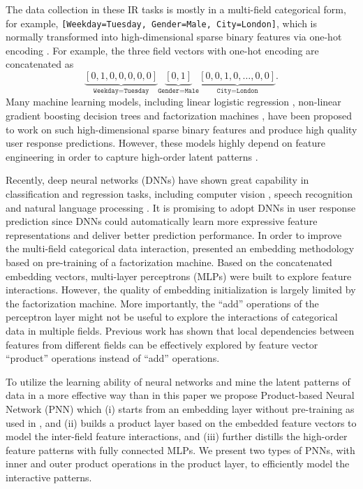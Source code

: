 \documentclass[conference]{IEEEtran}
\begin{document}
The data collection in these IR tasks is mostly in a multi-field categorical form, for example, \texttt{[Weekday=Tuesday, Gender=Male, City=London]}, which is normally transformed into high-dimensional sparse binary features via one-hot encoding \cite{he2014practical}.
For example, the three field vectors with one-hot encoding are concatenated as
\[ \underbrace{[0,1,0,0,0,0,0]}_{\texttt{Weekday=Tuesday}}\underbrace{[0,1]}_{\texttt{Gender=Male}} \underbrace{[0,0,1,0,\ldots,0,0]}_{\texttt{City=London}}.\]
Many machine learning models, including linear logistic regression \cite{lee2012estimating}, non-linear gradient boosting decision trees \cite{he2014practical} and factorization machines \cite{ta2015factorization}, have been proposed to work on such high-dimensional sparse binary features and produce high quality user response predictions.
However, these models highly depend on feature engineering in order to capture high-order latent patterns \cite{cui2011bid}.


Recently, deep neural networks (DNNs) \cite{lecun2015deep} have shown great capability in classification and regression tasks, including computer vision \cite{krizhevsky2012imagenet}, speech recognition \cite{graves2013speech} and natural language processing \cite{mikolov2013distributed}. It is promising to adopt DNNs in user response prediction since DNNs could automatically learn more expressive feature representations and deliver better prediction performance.
In order to improve the multi-field categorical data interaction, \cite{zhang2016deep} presented an embedding methodology based on pre-training of a factorization machine. Based on the concatenated embedding vectors, multi-layer perceptrons (MLPs) were built to explore feature interactions. However, the quality of embedding initialization is largely limited by the factorization machine.
More importantly, the ``add'' operations of the perceptron layer might not be useful to explore the interactions of categorical data in multiple fields. Previous work \cite{menon2011response,ta2015factorization} has shown that local dependencies between features from different fields can be effectively explored by feature vector ``product'' operations instead of ``add'' operations.






To utilize the learning ability of neural networks and mine the latent patterns of data in a more effective way than  in this paper we propose Product-based Neural Network (PNN) which (i) starts from an embedding layer without pre-training as used in \cite{zhang2016deep}, and (ii) builds a product layer based on the embedded feature vectors to model the inter-field feature interactions, and (iii) further distills the high-order feature patterns with fully connected MLPs.
We present two types of PNNs, with inner and outer product operations in the product layer, to efficiently model the interactive patterns.
\end{document}
